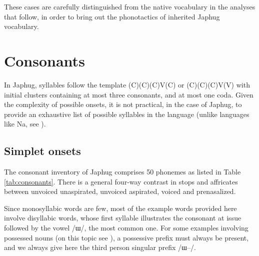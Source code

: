 \documentclass[oldfontcommands,oneside,a4paper,11pt]{article}
\newcommand{\ipa}[1]{{\phon/#1/}} %
\begin{document}
 These cases are carefully distinguished from the native vocabulary in the analyses that follow, in order to bring out the phonotactics of inherited Japhug vocabulary.

 
 \section{Consonants}
 In Japhug, syllables follow the template (C)(C)(C)V(C) or (C)(C)(C)V(V) with initial clusters containing at most three consonants, and at most one coda. Given the complexity of possible onsets, it is not practical, in the case of Japhug, to provide an exhaustive list of possible syllables in the language (unlike languages like Na, see \citealt{boydalexis06}).
 
 \subsection{Simplet onsets} \label{sec:simple}
 The consonant inventory of Japhug comprises 50 phonemes as listed in Table \ref{tab:consonants}. There is a general four-way contrast in stops and affricates between unvoiced unaspirated, unvoiced aspirated, voiced and prenasalized.
 
Since monosyllabic words are few,  most of the example words provided here involve disyllabic words, whose first syllable illustrates the consonant at issue followed by the vowel \ipa{ɯ}, the most common one. For some examples involving possessed nouns (on this topic see \citealt[6]{jacques14antipassive}), a possessive prefix must always be present, and we always give here the third person singular prefix  \ipa{ɯ--}.
 
\end{document}
